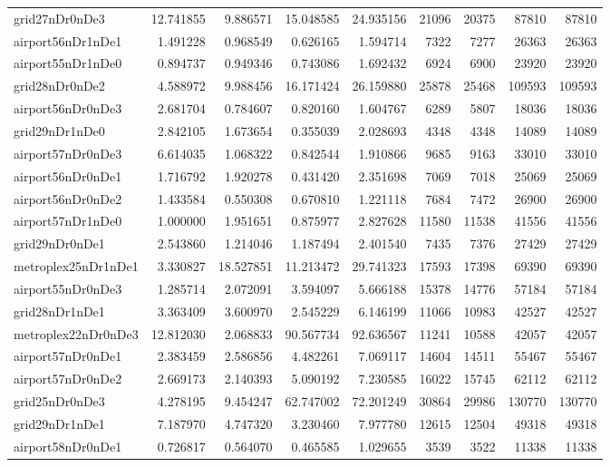 \begin{longtable}{|l|r|r|r|r|r|r|r|r|}
grid27nDr0nDe3 & 12.741855 & 9.886571 & 15.048585 & 24.935156 & 21096 & 20375 & 87810 & 87810 \\
airport56nDr1nDe1 & 1.491228 & 0.968549 & 0.626165 & 1.594714 & 7322 & 7277 & 26363 & 26363 \\
airport55nDr1nDe0 & 0.894737 & 0.949346 & 0.743086 & 1.692432 & 6924 & 6900 & 23920 & 23920 \\
grid28nDr0nDe2 & 4.588972 & 9.988456 & 16.171424 & 26.159880 & 25878 & 25468 & 109593 & 109593 \\
airport56nDr0nDe3 & 2.681704 & 0.784607 & 0.820160 & 1.604767 & 6289 & 5807 & 18036 & 18036 \\
grid29nDr1nDe0 & 2.842105 & 1.673654 & 0.355039 & 2.028693 & 4348 & 4348 & 14089 & 14089 \\
airport57nDr0nDe3 & 6.614035 & 1.068322 & 0.842544 & 1.910866 & 9685 & 9163 & 33010 & 33010 \\
airport56nDr0nDe1 & 1.716792 & 1.920278 & 0.431420 & 2.351698 & 7069 & 7018 & 25069 & 25069 \\
airport56nDr0nDe2 & 1.433584 & 0.550308 & 0.670810 & 1.221118 & 7684 & 7472 & 26900 & 26900 \\
airport57nDr1nDe0 & 1.000000 & 1.951651 & 0.875977 & 2.827628 & 11580 & 11538 & 41556 & 41556 \\
grid29nDr0nDe1 & 2.543860 & 1.214046 & 1.187494 & 2.401540 & 7435 & 7376 & 27429 & 27429 \\
metroplex25nDr1nDe1 & 3.330827 & 18.527851 & 11.213472 & 29.741323 & 17593 & 17398 & 69390 & 69390 \\
airport55nDr0nDe3 & 1.285714 & 2.072091 & 3.594097 & 5.666188 & 15378 & 14776 & 57184 & 57184 \\
grid28nDr1nDe1 & 3.363409 & 3.600970 & 2.545229 & 6.146199 & 11066 & 10983 & 42527 & 42527 \\
metroplex22nDr0nDe3 & 12.812030 & 2.068833 & 90.567734 & 92.636567 & 11241 & 10588 & 42057 & 42057 \\
airport57nDr0nDe1 & 2.383459 & 2.586856 & 4.482261 & 7.069117 & 14604 & 14511 & 55467 & 55467 \\
airport57nDr0nDe2 & 2.669173 & 2.140393 & 5.090192 & 7.230585 & 16022 & 15745 & 62112 & 62112 \\
grid25nDr0nDe3 & 4.278195 & 9.454247 & 62.747002 & 72.201249 & 30864 & 29986 & 130770 & 130770 \\
grid29nDr1nDe1 & 7.187970 & 4.747320 & 3.230460 & 7.977780 & 12615 & 12504 & 49318 & 49318 \\
airport58nDr0nDe1 & 0.726817 & 0.564070 & 0.465585 & 1.029655 & 3539 & 3522 & 11338 & 11338 \\

\end{longtable}
